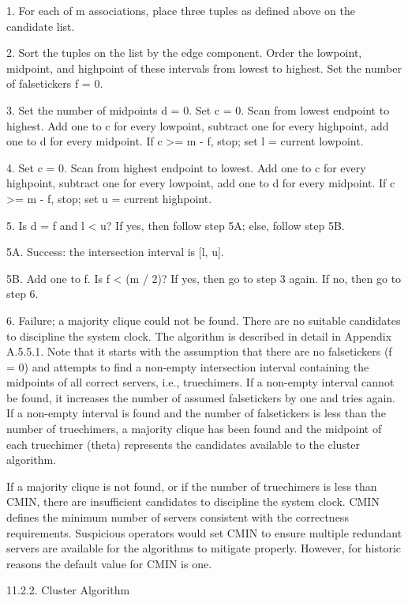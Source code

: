    1.  For each of m associations, place three tuples as defined above
   on the candidate list.

   2.  Sort the tuples on the list by the edge component.  Order the
   lowpoint, midpoint, and highpoint of these intervals from lowest to
   highest.  Set the number of falsetickers f = 0.

   3.  Set the number of midpoints d = 0.  Set c = 0.  Scan from lowest
   endpoint to highest.  Add one to c for every lowpoint, subtract one
   for every highpoint, add one to d for every midpoint.  If c >= m - f,
   stop; set l = current lowpoint.

   4.  Set c = 0.  Scan from highest endpoint to lowest.  Add one to c
   for every highpoint, subtract one for every lowpoint, add one to d
   for every midpoint.  If c >= m - f, stop; set u = current highpoint.

   5.  Is d = f and l < u?  If yes, then follow step 5A; else, follow
   step 5B.

   5A. Success: the intersection interval is [l, u].

   5B. Add one to f.  Is f < (m / 2)?  If yes, then go to step 3 again.
   If no, then go to step 6.

   6.  Failure; a majority clique could not be found.  There are no
   suitable candidates to discipline the system clock.
    The algorithm is described in detail in Appendix A.5.5.1.  Note that
   it starts with the assumption that there are no falsetickers (f = 0)
   and attempts to find a non-empty intersection interval containing the
   midpoints of all correct servers, i.e., truechimers.  If a non-empty
   interval cannot be found, it increases the number of assumed
   falsetickers by one and tries again.  If a non-empty interval is
   found and the number of falsetickers is less than the number of
   truechimers, a majority clique has been found and the midpoint of
   each truechimer (theta) represents the candidates available to the
   cluster algorithm.

   If a majority clique is not found, or if the number of truechimers is
   less than CMIN, there are insufficient candidates to discipline the
   system clock.  CMIN defines the minimum number of servers consistent
   with the correctness requirements.  Suspicious operators would set
   CMIN to ensure multiple redundant servers are available for the
   algorithms to mitigate properly.  However, for historic reasons the
   default value for CMIN is one.

11.2.2.  Cluster Algorithm

